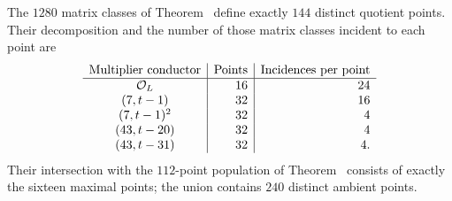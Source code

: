 \begin{proposition}[The $144$ selected $d=3$ ambient points]
\label{prop:d3ambientpoints}
The $1280$ matrix classes of Theorem~ define exactly
$144$ distinct quotient points.  Their decomposition and the number
of those matrix classes incident to each point are
\[
\begin{array}{c|r|r}
\text{Multiplier conductor}&\text{Points}&\text{Incidences per point}\\\hline
\mathcal O_L&16&24\\
(7,t-1)&32&16\\
(7,t-1)^2&32&4\\
(43,t-20)&32&4\\
(43,t-31)&32&4.
\end{array}
\]
Their intersection with the $112$-point population of
Theorem~ consists of exactly the sixteen maximal
points; the union contains $240$ distinct ambient points.
\end{proposition}

